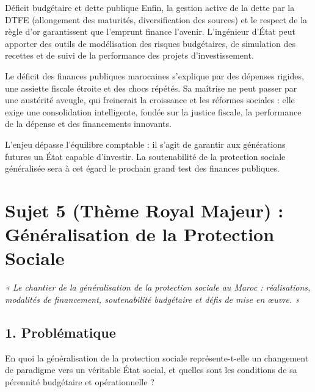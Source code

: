\begin{copiemodele}{Déficit budgétaire et dette publique}
Enfin, la gestion active de la dette par la DTFE (allongement des maturités, diversification des sources) et le respect de la règle d'or garantissent que l'emprunt finance l'avenir. L'ingénieur d'État peut apporter des outils de modélisation des risques budgétaires, de simulation des recettes et de suivi de la performance des projets d'investissement.

Le déficit des finances publiques marocaines s'explique par des dépenses rigides, une assiette fiscale étroite et des chocs répétés. Sa maîtrise ne peut passer par une austérité aveugle, qui freinerait la croissance et les réformes sociales : elle exige une consolidation intelligente, fondée sur la justice fiscale, la performance de la dépense et des financements innovants.

L'enjeu dépasse l'équilibre comptable : il s'agit de garantir aux générations futures un État capable d'investir. La soutenabilité de la protection sociale généralisée sera à cet égard le prochain grand test des finances publiques.
\end{copiemodele}

\section{Sujet 5 (Thème Royal Majeur) : Généralisation de la Protection Sociale}

\begin{tcolorbox}[colback=blue!5!white,colframe=blue!75!black,title=\textbf{Thème Stratégique et Sujet Très Probable}]
\textit{« Le chantier de la généralisation de la protection sociale au Maroc : réalisations, modalités de financement, soutenabilité budgétaire et défis de mise en œuvre. »}
\end{tcolorbox}

\subsection*{1. Problématique}
En quoi la généralisation de la protection sociale représente-t-elle un changement de paradigme vers un véritable État social, et quelles sont les conditions de sa pérennité budgétaire et opérationnelle ?

